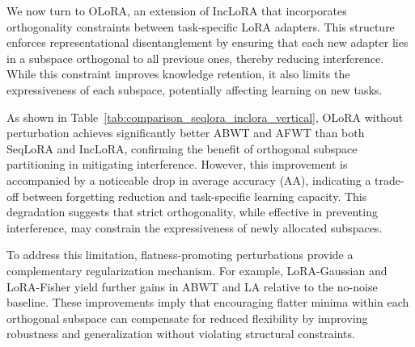 \documentclass[letterpaper]{article} %
\begin{document}
\begin{table}[htbp]
\centering
{}
\caption{Performance comparison of {OLoRA} under the TRACE benchmark.}
\label{tab:seqlora_trace_dualcol}
\end{table}


We now turn to OLoRA, an extension of IncLoRA that incorporates orthogonality constraints between task-specific LoRA adapters. This structure enforces representational disentanglement by ensuring that each new adapter lies in a subspace orthogonal to all previous ones, thereby reducing interference. While this constraint improves knowledge retention, it also limits the expressiveness of each subspace, potentially affecting learning on new tasks.


As shown in Table~\ref{tab:comparison_seqlora_inclora_vertical}, OLoRA without perturbation achieves significantly better ABWT and AFWT than both SeqLoRA and IncLoRA, confirming the benefit of orthogonal subspace partitioning in mitigating interference. However, this improvement is accompanied by a noticeable drop in average accuracy (AA), indicating a trade-off between forgetting reduction and task-specific learning capacity. This degradation suggests that strict orthogonality, while effective in preventing interference, may constrain the expressiveness of newly allocated subspaces.

To address this limitation, flatness-promoting perturbations provide a complementary regularization mechanism. For example, LoRA-Gaussian and LoRA-Fisher yield further gains in ABWT and LA relative to the no-noise baseline. These improvements imply that encouraging flatter minima within each orthogonal subspace can compensate for reduced flexibility by improving robustness and generalization without violating structural constraints.
\end{document}
